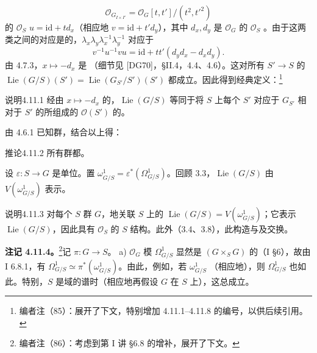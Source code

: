 \[\mathcal O_{G_{I\times I'}}=\mathcal O_G[t,t']/(t^2,t'^2)\]
的 $\mathcal O_S$  $u=\mathrm{id}+td_x$（相应地 $v=\mathrm{id}+t'd_y$），其中 $d_x,d_y$ 是 $\mathcal O_G$ 的 $\mathcal O_S$ 。由于这两类之间的对应是的，$\lambda_x\lambda_y\lambda_x^{-1}\lambda_y^{-1}$ 对应于
\[v^{-1}u^{-1}vu=\mathrm{id}+tt'(d_yd_x-d_xd_y).\]
由 4.7.3，$x\mapsto-d_x$ 是 （细节见 [DG70]，\S II.4，4.4、4.6）。这对所有 $S'\to S$ 的 $\operatorname{Lie}(G/S)(S')=\operatorname{Lie}(G_{S'}/S')(S')$ 都成立。因此得到经典定义：\footnote{编者注（85）：展开了下文，特别增加 4.11.1--4.11.8 的编号，以供后续引用。}
\begin{SGAresult}{说明}{4.11.1}
经由 $x\mapsto-d_x$ 的，$\operatorname{Lie}(G/S)$ 等同于将 $S$ 上每个 $S'$ 对应于 $G_{S'}$ 相对于 $S'$ 的所组成的 $\mathcal O(S')$ 的。
\end{SGAresult}
由 4.6.1 已知群，结合以上得：
\begin{SGAresult}{推论}{4.11.2}
所有群都。
\end{SGAresult}
设 $\varepsilon:S\to G$ 是单位。置 $\omega^1_{G/S}=\varepsilon^*(\Omega^1_{G/S})$。回顾 3.3，$\operatorname{Lie}(G/S)$ 由 $V(\omega^1_{G/S})$ 表示。
\begin{SGAresult}{说明}{4.11.3}
对每个 $S$ 群 $G$，地关联 $S$ 上的 $\operatorname{Lie}(G/S)=V(\omega^1_{G/S})$；它表示 $\operatorname{Lie}(G/S)$，因此具有 $\mathcal O_S$ 的 $S$ 结构。此外（3.4、3.8），此构造与及交换。
\end{SGAresult}
\textbf{注记 4.11.4。}\footnote{编者注（86）：考虑到第 I 讲 \S 6.8 的增补，展开了下文。}记 $\pi:G\to S$。
a) $\mathcal O_G$ 模 $\Omega^1_{G/S}$ 显然是 $(G\times_SG)$ 的（I \S 6），故由 I 6.8.1，有 $\Omega^1_{G/S}\simeq\pi^*(\omega^1_{G/S})$。由此，例如，若 $\omega^1_{G/S}$ （相应地），则 $\Omega^1_{G/S}$ 也如此。特别，$S$ 是域的谱时（相应地再假设 $G$ 在 $S$ 上），这总成立。
